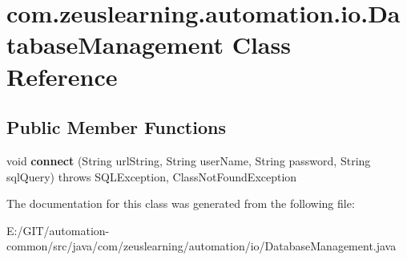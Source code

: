 \hypertarget{classcom_1_1zeuslearning_1_1automation_1_1io_1_1DatabaseManagement}{}\section{com.\+zeuslearning.\+automation.\+io.\+Database\+Management Class Reference}
\label{classcom_1_1zeuslearning_1_1automation_1_1io_1_1DatabaseManagement}
\subsection*{Public Member Functions}
\begin{DoxyCompactItemize}
\item 
\hypertarget{classcom_1_1zeuslearning_1_1automation_1_1io_1_1DatabaseManagement_a50a5b763218a255b29be252e65cc4278}{}\label{classcom_1_1zeuslearning_1_1automation_1_1io_1_1DatabaseManagement_a50a5b763218a255b29be252e65cc4278} 
void {\bfseries connect} (String url\+String, String user\+Name, String password, String sql\+Query)  throws S\+Q\+L\+Exception, Class\+Not\+Found\+Exception 
\end{DoxyCompactItemize}


The documentation for this class was generated from the following file\+:\begin{DoxyCompactItemize}
\item 
E\+:/\+G\+I\+T/automation-\/common/src/java/com/zeuslearning/automation/io/Database\+Management.\+java\end{DoxyCompactItemize}
